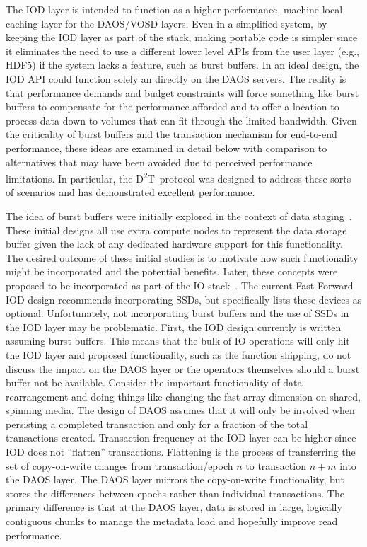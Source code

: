 \documentclass[conference]{IEEEtran}
\newcommand{\DDT}{D\textsuperscript{2}T~}
\begin{document}
The IOD layer is intended to function as a higher performance, machine local
caching layer for the DAOS/VOSD layers. Even in a simplified system, by keeping
the IOD layer as part of the stack, making portable code is simpler since it
eliminates the need to use a different lower level APIs from the user layer
(e.g., HDF5) if the system lacks a feature, such as burst buffers. In an ideal
design, the IOD API could function solely an directly on the DAOS servers. The
reality is that performance demands and budget constraints will force something
like burst buffers to compensate for the performance afforded and to offer a
location to process data down to volumes that can fit through the limited
bandwidth. Given the criticality of burst buffers and the transaction mechanism
for end-to-end performance, these ideas are examined in detail below with
comparison to alternatives that may have been avoided due to perceived
performance limitations. In particular, the \DDT protocol was designed to
address these sorts of scenarios and has demonstrated excellent performance.

The idea of burst buffers were initially explored in the context of data
staging~\cite{abbasi:2007:datatap,Abbasi:2009:datatap,nisar:2008:staging,zheng:2010:predata}.
These initial designs all use extra compute nodes to represent the data storage
buffer given the lack of any dedicated hardware support for this functionality.
The desired outcome of these initial studies is to motivate how such
functionality might be incorporated and the potential benefits.  Later, these
concepts were proposed to be incorporated as part of the IO
stack~\cite{nowoczynski:2008:zest,bent:2012:challenges,bent:2012:burst-buffer}.
The current Fast Forward IOD design recommends incorporating SSDs, but
specifically lists these devices as optional. Unfortunately, not incorporating
burst buffers and the use of SSDs in the IOD layer may be problematic.  First,
the IOD design currently is written assuming burst buffers. This means that the
bulk of IO operations will only hit the IOD layer and proposed functionality,
such as the function shipping, do not discuss the impact on the DAOS layer or
the operators themselves should a burst buffer not be available.  Consider the
important functionality of data rearrangement and doing things like changing
the fast array dimension on shared, spinning media.  The design of DAOS assumes
that it will only be involved when persisting a completed transaction and only
for a fraction of the total transactions created.  Transaction frequency at the
IOD layer can be higher since IOD does not ``flatten'' transactions. Flattening
is the process of transferring the set of copy-on-write changes from
transaction/epoch $n$ to transaction $n+m$ into the DAOS layer. The DAOS layer
mirrors the copy-on-write functionality, but stores the differences between
epochs rather than individual transactions. The primary difference is that at
the DAOS layer, data is stored in large, logically contiguous chunks to manage
the metadata load and hopefully improve read performance.
\end{document}
